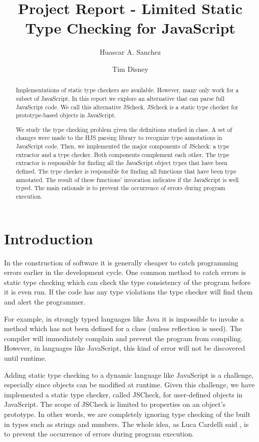 \documentclass{article}
\begin{document}
\title{Project Report - Limited Static Type Checking for JavaScript}
\author{Huascar A. Sanchez \and Tim Disney}

\maketitle

\lstset{showstringspaces=false}

\begin{abstract}
Implementations of static type checkers are available. However, many only work
for a subset of JavaScript. In this report we explore an alternative that can 
parse full JavaScript code. We call this alternative JScheck. JScheck is a static 
type checker for prototype-based objects in JavaScript.

We study the type checking problem given the definitions studied in class. A set of
changes were made to the HJS parsing library to recognize type annotations in 
JavaScript code. Then, we implemented the major components of JScheck: a type extractor
and a type checker. Both components complement each other. The type extractor is 
responsible for finding all the JavaScript object types that have been defined. The 
type checker is responsible for finding all functions that have been type annotated. 
The result of these functions' invocation indicates if the JavaScript is well typed. 
The main rationale is to prevent the occurrence of errors during program execution. 
\end{abstract}

\section{Introduction}
In the construction of software it is generally cheaper to 
catch programming errors earlier in the development cycle. One common method 
to catch errors is static type checking which can
check the type consistency of the program before it is even
run. If the code has any type violations the type checker will 
find them and alert the programmer.

For example, in strongly typed languages like Java it is impossible 
to invoke a method which has not been defined for a class (unless reflection is used).
The compiler will immediately complain and prevent the program from compiling. However, 
in languages like JavaScript, this kind of error will not be discovered until runtime.

Adding static type checking to a dynamic language like JavaScript is a 
challenge, especially since objects can be modified at runtime. Given this challenge, 
we have implemented a static type checker, called JSCheck, for user-defined objects 
in JavaScript. The scope of JSCheck is limited to properties on an object's
prototype. In other words, we are completely ignoring type checking of the built in types
such as strings and numbers. The whole idea, as Luca Cardelli said \cite{typesystems}, 
is to prevent the occurrence of errors during program execution. 
\end{document}
